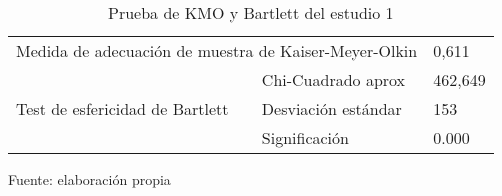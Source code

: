 \begin{table}[h]
    \caption {Prueba de KMO y Bartlett del estudio 1}
	\label{tab:kmo1}
	\setlength\extrarowheight{5pt}
	
	\begin{tabular}{p{5.7cm} p{4.6cm} p{2.8cm}}
	\toprule
	\multicolumn{2}{c}{Medida de adecuación de muestra de Kaiser-Meyer-Olkin}	& 0,611 \\
									& Chi-Cuadrado aprox	& 462,649 \\
	Test de esfericidad de Bartlett	& Desviación estándar					& 153 \\
									& Significación					& 0.000 \\
	\bottomrule
	\end{tabular}
	
	\center
	\footnotesize
	Fuente: elaboración propia
\end{table}
